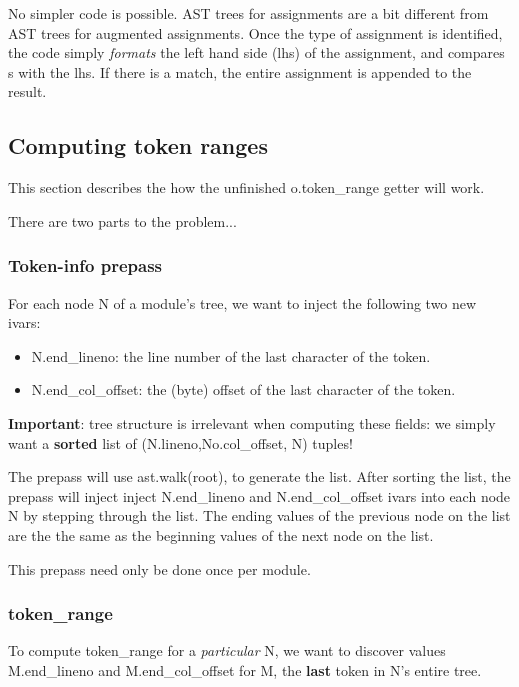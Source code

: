 \documentclass[a4paper,10pt,english]{sphinxmanual}
\begin{document}
No simpler code is possible. AST trees for assignments are a bit
different from AST trees for augmented assignments. Once the type of
assignment is identified, the code simply \emph{formats} the left hand side
(lhs) of the assignment, and compares s with the lhs. If there is a
match, the entire assignment is appended to the result.


\subsection{Computing token ranges}
\label{leoInspect:computing-token-ranges}
This section describes the how the unfinished o.token\_range getter will work.

There are two parts to the problem...


\subsubsection{Token-info prepass}
\label{leoInspect:token-info-prepass}
For each node N of a module's tree, we want to inject the following
two new ivars:
\begin{itemize}
\item {} 
N.end\_lineno: the line number of the last character of the token.

\item {} 
N.end\_col\_offset: the (byte) offset of the last character of the token.

\end{itemize}

\textbf{Important}: tree structure is irrelevant when computing these fields: we
simply want a \textbf{sorted} list of (N.lineno,No.col\_offset, N) tuples!

The prepass will use ast.walk(root), to generate the list.  After
sorting the list, the prepass will inject inject N.end\_lineno and
N.end\_col\_offset ivars into each node N by stepping through the list.
The ending values of the previous node on the list are the the same as
the beginning values of the next node on the list.

This prepass need only be done once per module.


\subsubsection{token\_range}
\label{leoInspect:token-range}
To compute token\_range for a \emph{particular} N, we want to discover
values M.end\_lineno and M.end\_col\_offset for M, the \textbf{last} token in
N's entire tree.
\end{document}
